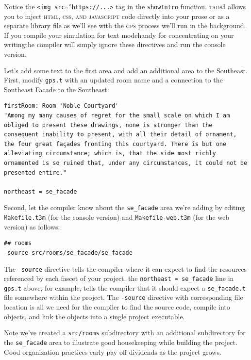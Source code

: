 Notice the \texttt{<img src='https://...>} tag in the
\texttt{\scriptsize{showIntro}} function.
\textsc{tads3} allows you to inject \textsc{html, css, and javascript} code
directly into your prose or as a separate library file as we'll see with the
\textsc{gps} process we'll run in the background. If you compile your simulation
for text mode\textemdash handy for concentrating on your writing\textemdash the
compiler will simply ignore these directives and run the
console version. 

Let's add some text to the first area and add an additional area to the
Southeast. First, modify \texttt{gps.t} with an updated room name and a
connection to the Southeast Facade to the Southeast:

\begin{lstlisting}
firstRoom: Room 'Noble Courtyard'
"Among my many causes of regret for the small scale on which I am obliged to present these drawings, none is stronger than the consequent inability to present, with all their detail of ornament, the four great façades fronting this courtyard. There is but one alleviating circumstance; which is, that the side most richly ornamented is so ruined that, under any circumstances, it could not be presented entire."

northeast = se_facade
\end{lstlisting}
Second, let the compiler know about the \texttt{se\_facade} area we're adding by
editing \texttt{Makefile.t3m} (for the console version) and
\texttt{Makefile-web.t3m} (for the web version) as follows:

\begin{lstlisting}
## rooms
-source src/rooms/se_facade/se_facade
\end{lstlisting}

The \texttt{-source} directive tells the compiler where it can expect to find
the resources referenced by each fascet of your project. the \texttt{northeast =
se\_facade} line in \texttt{gps.t} above, for example, tells the compiler that it
should expect a \texttt{se\_facade.t} file somewhere within the project. The
\texttt{-source} directive with corresponding file location is all we need for
the compiler to find the source code, compile into objects, and link the objects
into a single project executable.

Note we've created a \texttt{\scriptsize{src/rooms}} subdirectory with an additional
subdirectory for the \texttt{\scriptsize{se\_facade}} area to illustrate good housekeeping
while building the project. Good organization practices early pay off
dividends as the project grows.

